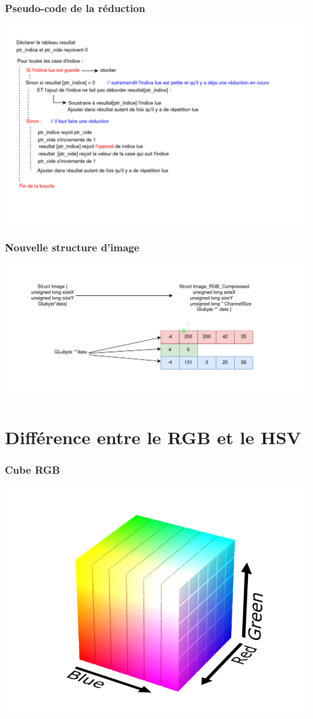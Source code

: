 \documentclass{beamer}
\begin{document}
    \begin{frame}
        \frametitle{Pseudo-code de la réduction}
        \includegraphics[width=\linewidth]{img/fig8.png}
    \end{frame}   
    
    
    \begin{frame}
        \frametitle{Nouvelle structure d'image}
        \includegraphics[width=\linewidth]{img/fig6.png}
    \end{frame}
    
    \section{Différence entre le RGB et le HSV}
    \begin{frame}
        \frametitle{Cube RGB}
        \includegraphics[width=\linewidth]{img/fig9.png}
    \end{frame}    
    
\end{document}

